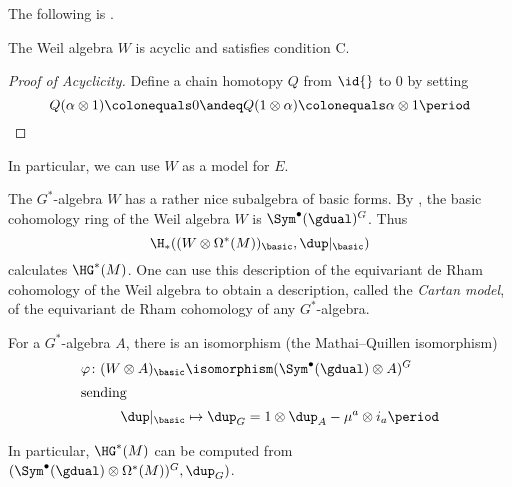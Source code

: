 The following is \cite[Theorem 3.2.1]{MR1689252}.
\begin{prop}
	The Weil algebra $W$ is acyclic and satisfies condition C.
\end{prop}

\begin{proof}[Proof of Acyclicity]
	Define a chain homotopy $ Q $ from $\id{}$ to $0$ by setting
	\begin{equation*}
		Q(\alpha\otimes 1) \colonequals 0 \andeq Q(1\otimes \alpha) \colonequals \alpha\otimes 1 \period \qedhere
	\end{equation*}
\end{proof}

\noindent In particular, we can use $W$ as a model for $E$.

The $G^*$-algebra $W$ has a rather nice subalgebra of basic forms. 
By \cite[Theorem 3.2.2]{MR1689252}, the basic cohomology ring of the Weil algebra $W$ is $\Sym^\bullet(\gdual)^G$. 
Thus 
\[\H_*((W\otimes \Omega^*(M))_{\basic},\dup \vert_{\basic})\]
 calculates $\HG^*(M)$. 
One can use this description of the equivariant de Rham cohomology of the Weil algebra to obtain a description, 
called the \emph{Cartan model}, 
of the equivariant de Rham cohomology of any $G^*$-algebra. 

\begin{thm}  \label{thm-Cartan}
	For a $G^*$-algebra $A$, there is an isomorphism (the Mathai--Quillen isomorphism) 
	\begin{align*}
		\varphi\colon (W\otimes A)_{\basic} &\isomorphism (\Sym^\bullet(\gdual)\otimes A)^G \\ 
		\shortintertext{sending}
		\dup \vert_{\basic} &\mapsto\dup_G=1\otimes \dup_A-\mu^a\otimes i_a \period
	\end{align*}
\end{thm}

\noindent In particular, $\HG^*(M)$ can be computed from $(\Sym^\bullet(\gdual)\otimes\Omega^*(M))^G,\dup_G)$.
